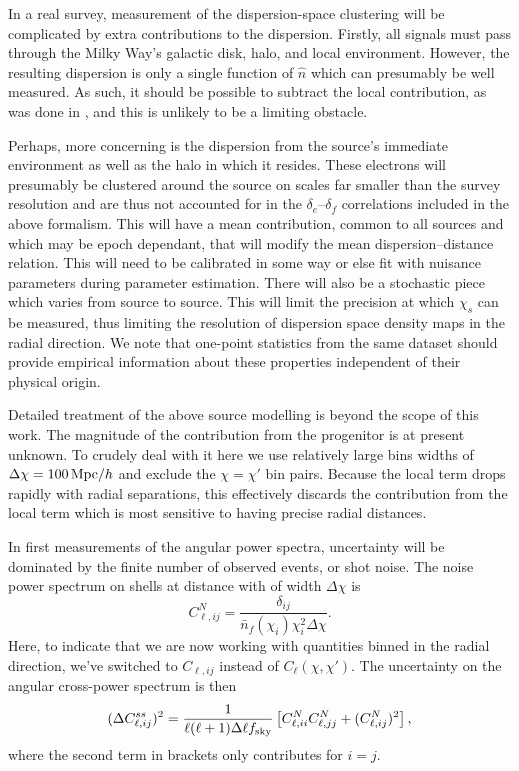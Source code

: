 \documentclass[twocolumn,prl,floatfix]{revtex4-1}
\begin{document}
In a real survey, measurement of the dispersion-space clustering
will be complicated by extra contributions to the dispersion.
Firstly, all signals
must pass through the Milky Way's galactic disk, halo, and local environment.
However, the resulting dispersion is only a
single function of $\hat n$ which can presumably be well
measured. As such, it should be
possible to subtract the local
contribution, as was done in
\citet{2014arXiv1412.4829D}, and this is unlikely to be a limiting obstacle.

Perhaps, more concerning is the dispersion from the source's immediate environment
as well as the halo in which it resides. These electrons will presumably be
clustered around the source on scales far smaller than the survey
resolution and are thus not accounted for in the
$\delta_e$--$\delta_f$
correlations included in the above formalism.  This will have a mean
contribution, common to all sources and which may be epoch dependant, that will
modify the mean dispersion--distance relation. This will need to be calibrated in some
way or else fit with nuisance parameters during parameter estimation.
There will also be a stochastic piece which varies from source to source.  This will
limit the precision at which $\chi_s$ can be measured, thus limiting the
resolution of dispersion space density maps in the radial direction.
We note that one-point statistics from the same dataset 
should provide empirical information about these properties independent
of their physical origin.

Detailed treatment of the above source modelling is beyond the scope of this
work. The magnitude of the contribution from the progenitor is at present
unknown. To crudely deal with it here we use relatively large
bins widths of $\Delta\chi = 100\,{\rm Mpc}/h$
and exclude the $\chi = \chi'$ bin pairs.
Because the local term drops rapidly with radial separations, this effectively 
discards the contribution from the local term which is most sensitive to having
precise radial distances.

In first measurements of the angular power spectra, uncertainty will be
dominated by the finite number of observed events, or shot noise.
The noise power spectrum on shells at distance with of width
$\Delta \chi$ is
\begin{equation}
    C^N_{\ell, ij} = \frac{\delta_{ij}}{\bar n_f(\chi_i)\chi_i^2\Delta\chi}.
\end{equation}
Here, to indicate that we are now working with quantities binned in the radial
direction, we've switched to $C_{\ell,ij}$ instead of
$C_\ell(\chi, \chi')$. The uncertainty on the angular
cross-power spectrum is then
\begin{align}
    (\Delta{C^{ss}_{\ell,ij}})^2 = 
    {\frac{1}{\ell(\ell + 1)\Delta \ell f_{\rm sky}}}
        \left[C^N_{\ell,ii} C^N_{\ell,jj} +  (C^N_{\ell,ij})^2\right],
\end{align}
where the second term in brackets only contributes for $i = j$.
\end{document}
